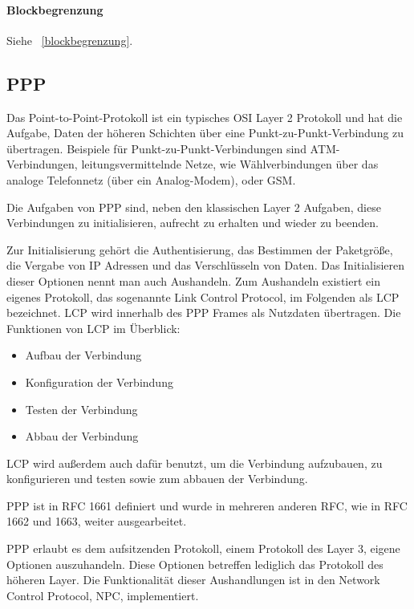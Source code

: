 \documentclass[12pt, a4paper, ngerman]{article}
\begin{document}
\paragraph{Blockbegrenzung}
Siehe ~\ref{blockbegrenzung}.
 
\subsection{PPP}

Das Point-to-Point-Protokoll ist ein typisches OSI Layer 2 Protokoll und hat die Aufgabe, Daten der höheren Schichten über eine Punkt-zu-Punkt-Verbindung zu übertragen. Beispiele für Punkt-zu-Punkt-Verbindungen sind ATM-Verbindungen, leitungsvermittelnde Netze, wie Wählverbindungen über das analoge Telefonnetz (über ein Analog-Modem), oder GSM.

Die Aufgaben von PPP sind, neben den klassischen Layer 2 Aufgaben, diese Verbindungen zu initialisieren, aufrecht zu erhalten und wieder zu beenden.

Zur Initialisierung gehört die Authentisierung, das Bestimmen der Paketgröße, die Vergabe von IP Adressen und das Verschlüsseln von Daten.  
Das Initialisieren dieser Optionen nennt man auch Aushandeln. Zum Aushandeln existiert ein eigenes Protokoll, das sogenannte Link Control Protocol, im Folgenden als LCP bezeichnet. LCP wird innerhalb des PPP Frames als Nutzdaten übertragen.
Die Funktionen von LCP im Überblick:
\begin{itemize}
	\item Aufbau der Verbindung
	\item Konfiguration der Verbindung
	\item Testen der Verbindung
	\item Abbau der Verbindung
\end{itemize}
LCP wird außerdem auch dafür benutzt, um die Verbindung aufzubauen, zu konfigurieren und testen sowie zum abbauen der Verbindung. 

PPP ist in RFC 1661 definiert und wurde in mehreren anderen RFC, wie in RFC 1662 und 1663, weiter ausgearbeitet.

PPP erlaubt es dem aufsitzenden Protokoll, einem Protokoll des Layer 3, eigene Optionen auszuhandeln. Diese Optionen betreffen lediglich das Protokoll des höheren Layer. Die Funktionalität dieser Aushandlungen ist in den Network Control Protocol, NPC, implementiert.
\end{document}
